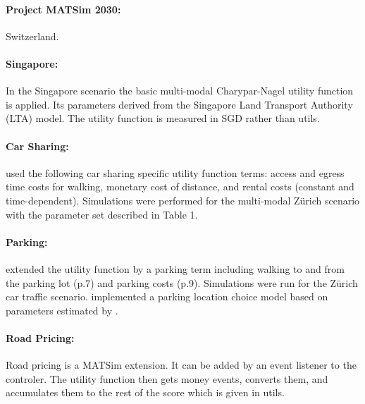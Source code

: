 \paragraph{Project MATSim 2030:}
Switzerland. 

\paragraph{Singapore:}
In the Singapore scenario \citep[][]{ErathEtAl_IATBR_2012} the basic multi-modal Charypar-Nagel utility function is applied. Its parameters derived from the Singapore Land Transport Authority (LTA) model. The utility function is measured in SGD rather than utils.

\paragraph{Car Sharing:}
\citet[][p.10]{CiariEtAl_TechRep_IVT_2014} used the following car sharing specific utility function terms: access and egress time costs for walking, monetary cost of distance, and rental costs (constant and time-dependent). Simulations were performed for the multi-modal Zürich scenario with the parameter set described in Table 1.

\paragraph{Parking:}
\citet[][]{WaraichAxhausen_TechRep_IVT_2012} extended the utility function by a parking term including walking to and from the parking lot (p.7) and parking costs (p.9). Simulations were run for the Zürich car traffic scenario. \citet{WaraichEtAl_unpub_TRB_2013} implemented a parking location choice model based on parameters estimated by \citet[][]{WeisEtAl_TechRep_TSMS_2013}.

\paragraph{Road Pricing:}
Road pricing is a MATSim extension. It can be added by an event listener to the controler. The utility function then gets money events, converts them, and accumulates them to the rest of the score which is given in utils.

